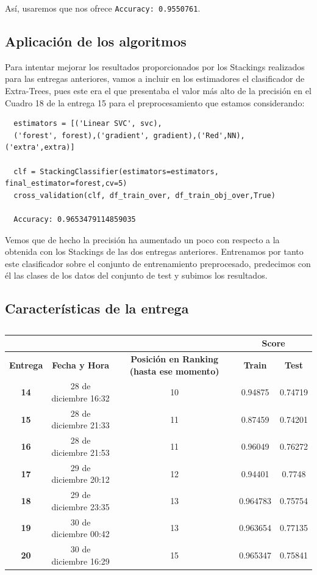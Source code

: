\documentclass[a4paper,11pt]{article}
\begin{document}
  Así, usaremos  que nos ofrece 
   \texttt{Accuracy:  0.9550761}.
  \subsection{Aplicación de los algoritmos}
  Para intentar mejorar los resultados proporcionados por los Stackings realizados para las entregas anteriores, vamos a incluir en los estimadores el clasificador de Extra-Trees, pues este era el que presentaba el valor más alto de la precisión en el Cuadro 18 de la entrega 15 para el preprocesamiento que estamos considerando:
  
  \begin{verbatim}
  estimators = [('Linear SVC', svc),
  ('forest', forest),('gradient', gradient),('Red',NN),('extra',extra)]
  
  clf = StackingClassifier(estimators=estimators, final_estimator=forest,cv=5)
  cross_validation(clf, df_train_over, df_train_obj_over,True)
  
  Accuracy: 0.9653479114859035
  \end{verbatim}
  
  Vemos que de hecho la precisión ha aumentado un poco con respecto a la obtenida con los Stackings de las dos entregas anteriores. Entrenamos por tanto este clasificador sobre el conjunto de entrenamiento preprocesado, predecimos con él las clases de los datos del conjunto de test y subimos los resultados. 
  
  \subsection{Características de la entrega}
  \begin{table}[htbp]
  	\caption{}
  	\begin{tabular}{|c|c|c|c|c|}
  		\hline
  		\multicolumn{1}{|l|}{\textbf{}} & \textbf{} & \textbf{} & \multicolumn{ 2}{c|}{\textbf{Score}} \\ \hline
  		\textbf{Entrega} & \textbf{Fecha y Hora} & \textbf{Posición en Ranking (hasta ese momento)} & \textbf{Train} & \textbf{Test} \\ \hline
  		\textbf{14} & 28 de diciembre 16:32  & 10 & 0.94875 & 0.74719 \\ \hline
  		\textbf{15} & 28 de diciembre 21:33  & 11 & 0.87459 & 0.74201 \\ \hline
  		\textbf{16} & 28 de diciembre 21:53 & 11 & 0.96049 & 0.76272 \\ \hline
  		\textbf{17} & 29 de diciembre 20:12 & 12 & 0.94401 & 0.7748 \\ \hline
  		\textbf{18} & 29 de diciembre 23:35  & 13 & 0.964783 & 0.75754 \\ \hline
  		\textbf{19} & 30 de diciembre 00:42  & 13 & 0.963654 & 0.77135 \\ \hline
  		\textbf{20} & 30 de diciembre 16:29  & 15 & 0.965347 & 0.75841 \\ \hline
  	\end{tabular}
  	\label{}
  \end{table}
  
\end{document}
